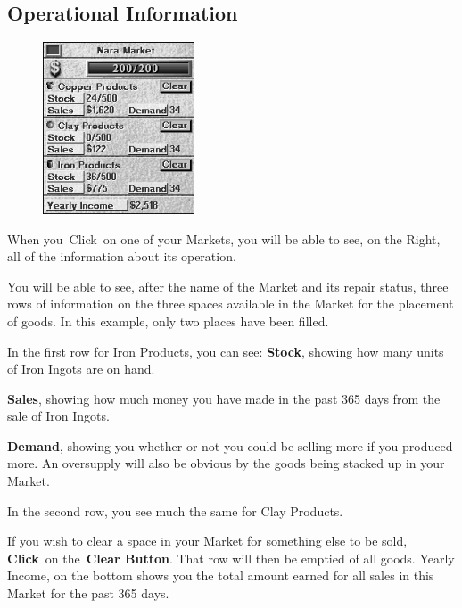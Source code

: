 \subsection{Operational Information}

\begin{figure}
	\vspace{-20pt}
	\begin{center}
		\includegraphics[width=0.4\textwidth]{Imarketinfo}
	\end{center}
	\vspace{-20pt}
\end{figure}

When you Click on one of your Markets, you will be able to see, on the Right, all of the information about its operation.

You will be able to see, after the name of the Market and its repair status, three rows of information on the three spaces available in the Market for the placement of goods. In this example, only two places have been filled.

In the first row for Iron Products, you can see:
\textbf{Stock}, showing how many units of Iron Ingots are on hand.

\textbf{Sales}, showing how much money you have made in the past 365 days from the sale of Iron Ingots.

\textbf{Demand}, showing you whether or not you could be selling more if you produced more. An oversupply will also be obvious by the goods being stacked up in your Market.

In the second row, you see much the same for Clay Products.

If you wish to clear a space in your Market for something else to be sold, \textbf{Click} on the \textbf{Clear Button}. That row will then be emptied of all goods.
Yearly Income, on the bottom shows you the total amount earned for all sales in this Market for the past 365 days.

